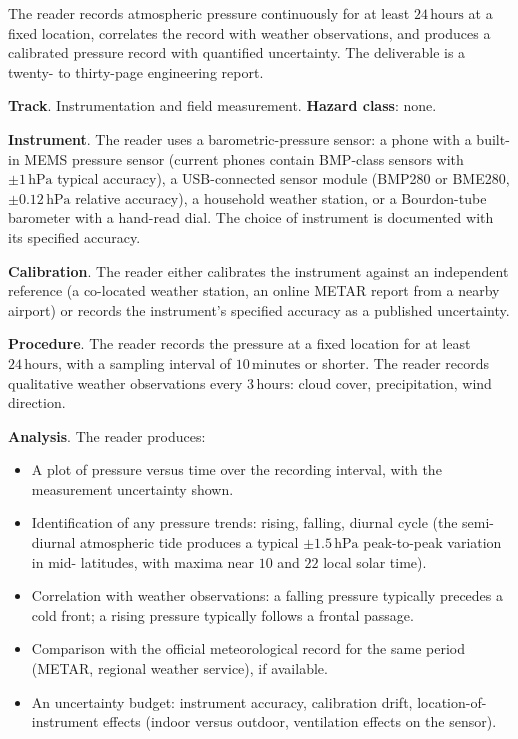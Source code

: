 \begin{project}
The reader records atmospheric pressure continuously for at least
$24\,\text{hours}$ at a fixed location, correlates the record
with weather observations, and produces a calibrated pressure
record with quantified uncertainty. The deliverable is a
twenty- to thirty-page engineering report.

\textbf{Track}. Instrumentation and field measurement.
\textbf{Hazard class}: none.

\textbf{Instrument}. The reader uses a barometric-pressure
sensor: a phone with a built-in MEMS pressure sensor (current
phones contain BMP-class sensors with $\pm 1\,\text{hPa}$
typical accuracy), a USB-connected sensor module (BMP280 or
BME280, $\pm 0.12\,\text{hPa}$ relative accuracy), a household
weather station, or a Bourdon-tube barometer with a hand-read
dial. The choice of instrument is documented with its specified
accuracy.

\textbf{Calibration}. The reader either calibrates the
instrument against an independent reference (a co-located
weather station, an online METAR report from a nearby airport)
or records the instrument's specified accuracy as a published
uncertainty.

\textbf{Procedure}. The reader records the pressure at a fixed
location for at least $24\,\text{hours}$, with a sampling
interval of $10\,\text{minutes}$ or shorter. The reader records
qualitative weather observations every $3\,\text{hours}$:
cloud cover, precipitation, wind direction.

\textbf{Analysis}. The reader produces:

\begin{itemize}[leftmargin=*]
  \item A plot of pressure versus time over the recording
    interval, with the measurement uncertainty shown.
  \item Identification of any pressure trends: rising, falling,
    diurnal cycle (the semi-diurnal atmospheric tide produces a
    typical $\pm 1.5\,\text{hPa}$ peak-to-peak variation in mid-
    latitudes, with maxima near $10$ and $22$ local solar time).
  \item Correlation with weather observations: a falling
    pressure typically precedes a cold front; a rising pressure
    typically follows a frontal passage.
  \item Comparison with the official meteorological record for
    the same period (METAR, regional weather service), if
    available.
  \item An uncertainty budget: instrument accuracy, calibration
    drift, location-of-instrument effects (indoor versus
    outdoor, ventilation effects on the sensor).
\end{itemize}


\end{project}
